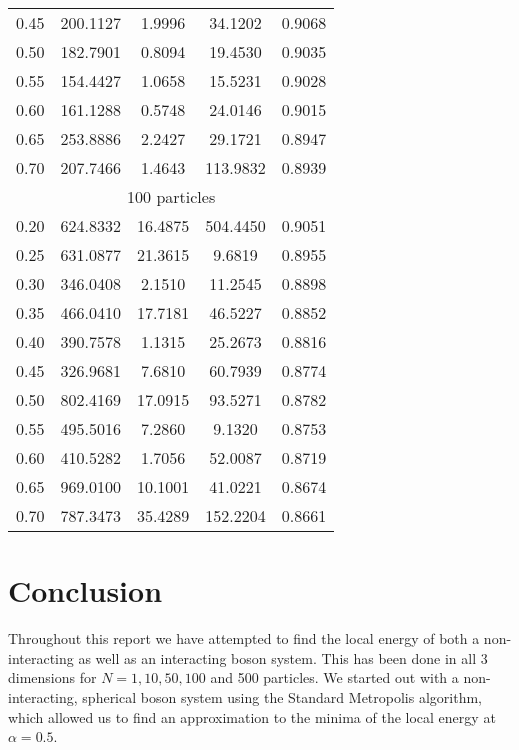 \documentclass[
    a4paper, aps, twocolumn, floatfix, superscriptaddress,
    nofootinbib]{revtex4-1}
\begin{document}
\begin{table}[h!]
{\begin{ruledtabular}
\begin{tabular}{ccccc}
0.45     & 200.1127 & 1.9996   & 34.1202    & 0.9068     \\
0.50     & 182.7901 & 0.8094   & 19.4530    & 0.9035       \\
0.55     & 154.4427 & 1.0658   & 15.5231    & 0.9028    \\
0.60     & 161.1288 & 0.5748   & 24.0146    & 0.9015        \\
0.65     & 253.8886 & 2.2427   & 29.1721    & 0.8947       \\
0.70     & 207.7466 & 1.4643   & 113.9832   & 0.8939       \\
\hline
\multicolumn{5}{c}{100 particles}               \\
\hline

0.20     & 624.8332 & 16.4875  & 504.4450   & 0.9051      \\
0.25     & 631.0877 & 21.3615  & 9.6819     & 0.8955      \\
0.30     & 346.0408 & 2.1510   & 11.2545    & 0.8898      \\
0.35     & 466.0410 & 17.7181  & 46.5227    & 0.8852      \\
0.40     & 390.7578 & 1.1315   & 25.2673    & 0.8816      \\
0.45     & 326.9681 & 7.6810   & 60.7939    & 0.8774      \\
0.50     & 802.4169 & 17.0915  & 93.5271    & 0.8782      \\
0.55     & 495.5016 & 7.2860   & 9.1320     & 0.8753      \\
0.60     & 410.5282 & 1.7056   & 52.0087    & 0.8719      \\
0.65     & 969.0100 & 10.1001  & 41.0221    & 0.8674      \\
0.70     & 787.3473 & 35.4289  & 152.2204   & 0.8661    \\
\end{tabular}
\end{ruledtabular}
}
\end{table}

\section{Conclusion}
Throughout this report we have attempted to find the local energy of both a non-interacting as well as an interacting boson system. This has been done in all 3 dimensions for $N = 1, 10, 50, 100$ and 500 particles. We started out with a non-interacting, spherical boson system using the Standard Metropolis algorithm, which allowed us to find an approximation to the minima of the local energy at $\alpha = 0.5$. 
\end{document}
